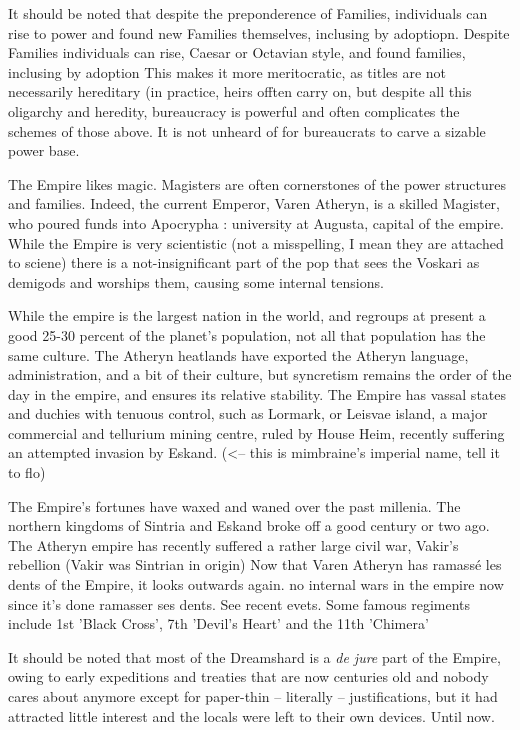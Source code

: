 It should be noted that despite the preponderence of Families, individuals can rise to power and found new Families themselves, inclusing by adoptiopn.
Despite Families individuals can rise, Caesar or Octavian style, and found families, inclusing by adoption
This makes it more meritocratic, as titles are not necessarily hereditary (in practice, heirs offten carry on, but despite all this oligarchy and heredity,  bureaucracy is powerful and often complicates the schemes of those above. It is not unheard of for bureaucrats to carve a sizable power base.

The Empire likes magic. Magisters are often cornerstones of the power structures and families. Indeed, the current Emperor, Varen Atheryn, is a skilled Magister, who poured funds into Apocrypha : university at Augusta, capital of the empire. While the Empire is very scientistic (not a misspelling, I mean they are attached to sciene) there is a not-insignificant part of the pop that sees the Voskari as demigods and worships them, causing some internal tensions. 


While the empire is the largest nation in the world, and regroups at present a good 25-30 percent of the planet's population, not all that population has the same culture. The Atheryn heatlands have exported the Atheryn language, administration, and a bit of their culture, but syncretism remains the order of the day in the empire, and ensures its relative stability. The Empire has vassal states and duchies with tenuous control, such as Lormark, or Leisvae island, a major commercial and tellurium mining centre, ruled by House Heim, recently suffering an attempted invasion by Eskand. (<-- this is mimbraine's imperial name, tell it to flo)


The Empire's fortunes have waxed and waned over the past millenia. The northern kingdoms of Sintria and Eskand broke off a good century or two ago. The Atheryn empire has recently suffered a rather large civil war, Vakir's rebellion (Vakir was Sintrian in origin) Now that Varen Atheryn has ramassé les dents of the Empire, it looks outwards again.  no internal wars in the empire now since it's done ramasser ses dents. See recent evets. Some famous regiments include 1st 'Black Cross', 7th 'Devil's Heart' and the 11th 'Chimera'

It should be noted that most of the Dreamshard is a \textit{de jure} part of the Empire, owing to early expeditions and treaties that are now centuries old and nobody cares about anymore except for paper-thin -- literally -- justifications, but it had attracted little interest and the locals were left to their own devices. Until now.



